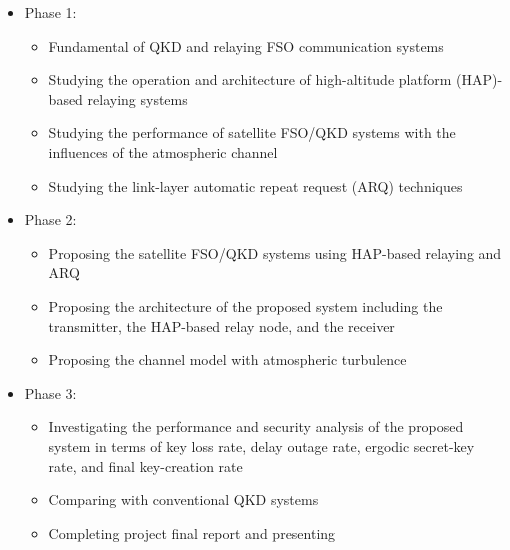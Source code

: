 \documentclass[12pt,onecolumn,letterpaper]{IEEEtran}
\begin{document}
\begin{itemize}
\item Phase 1:

	\begin{itemize}
	\item Fundamental of QKD and relaying FSO communication systems
	
	\item Studying the operation and architecture of high-altitude platform (HAP)-based relaying systems
	
	\item Studying the performance of satellite FSO/QKD systems with the influences of the atmospheric channel 
	
	\item Studying the link-layer automatic repeat request (ARQ) techniques
	\end{itemize}

\item Phase 2:
	
	\begin{itemize}
	\item Proposing the satellite FSO/QKD systems using HAP-based relaying and ARQ
	
	\item Proposing the architecture of the proposed system including the transmitter, the HAP-based relay node, and the receiver
	
	\item Proposing the channel model with atmospheric turbulence
	
	\end{itemize}

\item Phase 3:

	\begin{itemize}
	\item Investigating the performance and security analysis of the proposed system in terms of key loss rate, delay outage rate, ergodic secret-key rate, and final key-creation rate
	
	\item Comparing with conventional QKD systems
	
	\item Completing project final report and presenting
	\end{itemize}

\end{itemize}



%
\end{document}
